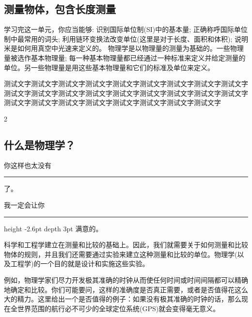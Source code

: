 \begin{Project}

\section{测量物体，包含长度测量}

\begin{Point*}
	学习完这一单元，你应当能够: 识别国际单位制(SI)中的基本量; 正确称呼国际单位制中最常用的词头; 利用链环变换法改变单位(这里是对于长度、面积和体积); 说明米是如何用真空中光速来定义的。
	\tcblower
	物理学是以物理量的测量为基础的。一些物理量被选作基本物理量; 每一种基本物理量都已经通过一种标准来定义并给定测量的单位。另一些物理量是用这些基本物理量和它们的标准及单位来定义。

\end{Point*}

测试文字测试文字测试文字测试文字测试文字测试文字测试文字测试文字测试文字测试文字测试文字测试文字测试文字测试文字测试文字测试文字测试文字测试文字测试文字测试文字测试文字测试文字测试文字测试文字测试文字测试文字




\begin{paracol}{2}
	\NoteArea[1.0em]
	
	
	
	\subsection{什么是物理学？}
	
	你这样也太没有 \leaders \hrule{} 了。
	
	我一定会让你 \leaders \hrule height
	-2.6pt depth 3pt \hskip 2cm 满意的。
	
	
	科学和工程学建立在测量和比较的基础上。因此，我们就需要关于如何测量和比较物体的规则，并且我们还需要通过实验来建立这种测量和比较的单位。物理学(以及工程学)的一个目的就是设计和实施这些实验。
	
	
	例如，物理学家们尽力开发极其准确的时钟从而使任何时间或时间间隔都可以精确地确定和比较。你们可能要问，这样的准确度是否真正需要，或者是否值得花这么大的精力。这里给出一个是否值得的例子：如果没有极其准确的时钟的话，那么现在全世界范围的航行必不可少的全球定位系统(GPS)就会变得毫无意义。
	

\end{paracol}
\end{Project}
